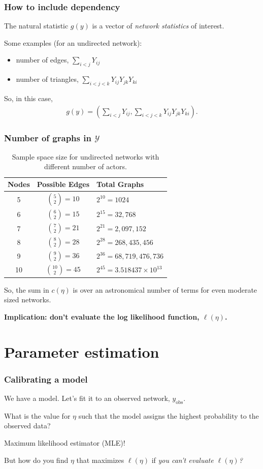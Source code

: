 \documentclass[ 10pt]{beamer}
\def\YY{{\mathcal Y}}
\newcommand{\yobs}{y_{\text{obs}}}
\begin{document}
\frame
{
\frametitle{How to include dependency}
The natural statistic $g(y)$ is a vector of \emph{network statistics} of interest.  
\vspace{2mm}

Some examples (for an undirected network):
\begin{itemize}
	\item number of edges, $\sum_{i<j} Y_{ij}$
	\item number of triangles, $\sum_{i < j < k} Y_{ij}Y_{jk}Y_{ki}$
\end{itemize}
\vspace{2mm}

So, in this case,
\begin{align*}
	g(y) = \left( \sum_{i<j} Y_{ij}, 
					\sum_{i < j < k} Y_{ij}Y_{jk}Y_{ki} \right ).
\end{align*}
}


\frame
{
\frametitle{Number of graphs in $\YY$}
\begin{table}[h] 
\caption{Sample space size for undirected networks with different number of 
actors.}

\begin{tabular}{ccl} 
\hline 
Nodes & Possible Edges & Total Graphs \\ [1ex]
\hline
5 & ${5 \choose 2} = 10$ & $2^{10} = 1024$ \\ [1ex]
6 & ${6 \choose 2} = 15$ & $2^{15} = 32,768$ \\ [1ex]
7 & ${7 \choose 2} = 21$ & $2^{21} = 2,097,152$ \\ [1ex]
8 & ${8 \choose 2} = 28$ & $2^{28} = 268,435,456$ \\ [1ex]
9 & ${9 \choose 2} = 36$ & $2^{36} = 68,719,476,736$ \\ [1ex]
10 & ${10 \choose 2} = 45$ & $2^{45} = 3.518437\times10^{13}$ \\ [1ex]
\hline 
\end{tabular} \label{T:number graphs}
\end{table}
\pause

So, the sum in $c(\eta)$ is over an astronomical number of terms for 
even moderate sized networks.
\vspace{2mm}

\textbf{Implication: don't evaluate the log likelihood function, $\ell(\eta)$.}
}

\section{Parameter estimation}
\frame
{
\frametitle{Calibrating a model}
We have a model. Let's fit it to an observed network, $\yobs$.
\vspace{3mm}

What is the value for $\eta$ such that the model assigns the highest probability to the observed data?
\vspace{2mm}

Maximum likelihood estimator (MLE)!
\vspace{10mm}

\pause
But how do you find $\eta$ that maximizes $\ell(\eta)$ if \emph{you can't 
evaluate $\ell(\eta)$?}
}
\end{document}

